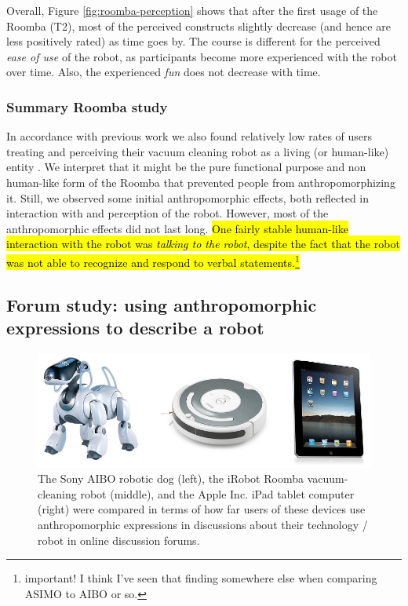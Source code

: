 \documentclass{frontiersSCNS} %
\begin{document}
Overall, Figure \ref{fig:roomba-perception} shows that after the first usage of
the Roomba (T2), most of the perceived constructs slightly decrease (and hence
are less positively rated) as time goes by. The course is different for the
perceived \textit{ease of use} of the robot, as participants become more
experienced with the robot over time. Also, the experienced \textit{fun} does
not decrease with time.
 

\subsubsection{Summary Roomba study\\}

In accordance with previous work we also found relatively low rates of users
treating and perceiving their vacuum cleaning robot as a living (or human-like)
entity \citep{sung_housewives_2008}. We interpret that it might be the pure
functional purpose and non human-like form of the Roomba that prevented people
from anthropomorphizing it. Still, we observed some initial anthropomorphic
effects, both reflected in interaction with and perception of the robot.
However, most of the anthropomorphic effects did not last long. \hl{One fairly
stable human-like interaction with the robot was \textit{talking to the robot},
despite the fact that the robot was not able to recognize and respond to verbal
statements.\footnote{important! I think I've seen that finding somewhere else
when comparing ASIMO to AIBO or so.}}


\subsection{Forum study: using anthropomorphic expressions to describe a robot}

\begin{figure}
    \centering
    \includegraphics[width=0.7\columnwidth]{aibo-roomba-ipad_2.jpg}
    \caption{The Sony AIBO robotic dog (left), the iRobot Roomba vacuum-cleaning robot (middle), and the Apple Inc. iPad tablet computer (right) were compared in terms of how far users of these devices use anthropomorphic expressions in discussions about their technology / robot in online discussion forums.}
    \label{fig:aibo-roomba-ipad}
\end{figure}
\end{document}
